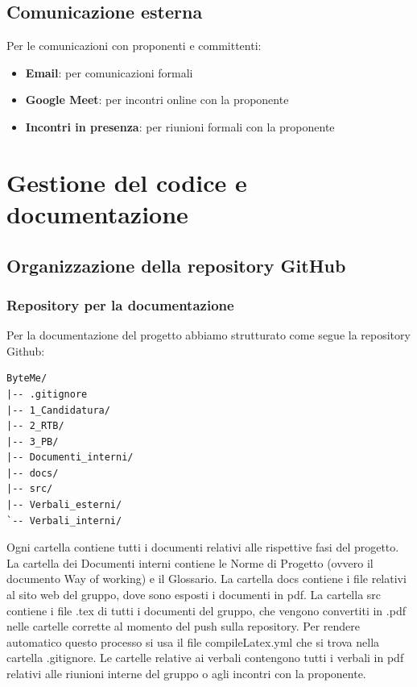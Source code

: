 \documentclass[11pt,a4paper]{article}
\begin{document}
\subsection{Comunicazione esterna}
Per le comunicazioni con proponenti e committenti:
\begin{itemize}
    \item \textbf{Email}: per comunicazioni formali
    \item \textbf{Google Meet}: per incontri online con la proponente
    \item \textbf{Incontri in presenza}: per riunioni formali con la proponente
\end{itemize}
\newpage

\section{Gestione del codice e documentazione}

\subsection{Organizzazione della repository GitHub}

\subsubsection{Repository per la documentazione}
Per la documentazione del progetto abbiamo strutturato come segue la repository Github:
\begin{verbatim}
ByteMe/
|-- .gitignore
|-- 1_Candidatura/
|-- 2_RTB/
|-- 3_PB/
|-- Documenti_interni/
|-- docs/
|-- src/
|-- Verbali_esterni/
`-- Verbali_interni/
\end{verbatim}

Ogni cartella contiene tutti i documenti relativi alle rispettive fasi del progetto.
La cartella dei Documenti interni contiene le Norme di Progetto (ovvero il documento Way of working) e il Glossario.
La cartella docs contiene i file relativi al sito web del gruppo, dove sono esposti i documenti in pdf.
La cartella src contiene i file .tex di tutti i documenti del gruppo, che vengono convertiti in .pdf nelle cartelle corrette al momento del push sulla repository. Per rendere automatico questo processo si usa il file compileLatex.yml che si trova nella cartella .gitignore.
Le cartelle relative ai verbali contengono tutti i verbali in pdf relativi alle riunioni interne del gruppo o agli incontri con la proponente.
\end{document}
